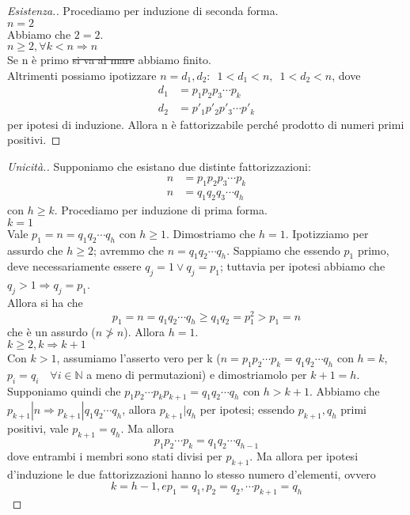 \documentclass[12pt,twoscolu]{article}
\newcommand{\N}{\mathbb{N}}
\newcommand{\implica}{\Longrightarrow}
\renewcommand\qedsymbol{$\blacksquare$}
\newcommand{\baseinduz}[1]{\\[1\baselineskip]{\boldmath$n = #1$}}
\newcommand{\induzdue}[1]{\\[1\baselineskip]{\boldmath$n \ge #1, \forall k < n \implica n$}}
\begin{document}
\renewcommand\qedsymbol{$\square$}
\begin{proof}[Esistenza.]
Procediamo per induzione di seconda forma.
\baseinduz{2}
\\Abbiamo che $ 2 = 2 $.
\induzdue{2}
\\Se n è primo \sout{si va al mare} abbiamo finito.
\\Altrimenti possiamo ipotizzare $n = d_1, d_2 :\enspace1 < d_1 < n,\enspace1 < d_2 < n$, dove
\begin{align*}
d_1 &= p_1 p_2 p_3 \cdots p_k \\
 d_2 &= p'_1 p'_2 p'_3 \cdots p'_k
\end{align*}
 per ipotesi di induzione. Allora n è fattorizzabile perché prodotto di numeri primi positivi.
\end{proof}

\renewcommand\qedsymbol{$\blacksquare$}
\begin{proof}[Unicità.]
Supponiamo che esistano due distinte fattorizzazioni:
\begin{align*}
n &= p_1 p_2 p_3 \cdots p_k \\
n &= q_1 q_2 q_3 \cdots q_h
\end{align*}
con $h \ge k$. Procediamo per induzione di prima forma.
\\[1\baselineskip]{\boldmath$k = 1$}
\\Vale $p_1 = n = q_1 q_2 \cdots q_h$ con $h \ge 1$. Dimostriamo che $h = 1$. Ipotizziamo per assurdo che $ h \ge 2$; avremmo che $ n = q_1 q_2 \cdots q_h$. Sappiamo che essendo $p_1$ primo, deve necessariamente essere $ q_j = 1 \lor q_j = p_1$; tuttavia per ipotesi abbiamo che $q_j > 1 \implica q_j = p_1$.
\\Allora si ha che
$$ p_1 = n = q_1 q_2 \cdots q_h \ge q_1 q_2 = p^2_1 > p_1 = n $$
che è un assurdo ($n \ngtr n$). Allora $h = 1$.
\\[1\baselineskip]{\boldmath$k \ge 2, k \implica k+1$}
\\Con $ k > 1 $, assumiamo l'asserto vero per k ($n = p_1 p_2 \cdots p_k = q_1 q_2 \cdots q_h$ con $h = k$, $p_i = q_i \quad\forall i \in \N$ a meno di permutazioni) e dimostriamolo per $k + 1 = h$. Supponiamo quindi che $p_1 p_2 \cdots p_k p_{k+1} = q_1 q_2 \cdots q_h$ con $h > k + 1$. Abbiamo che $p_{k+1} | n \implica p_{k+1} | q_1 q_2 \cdots q_h$, allora $p_{k+1} | q_h$ per ipotesi; essendo $p_{k+1}, q_h$ primi positivi, vale $p_{k+1} = q_h$. Ma allora 
$$p_1 p_2 \cdots p_k = q_1 q_2 \cdots q_{h-1} $$
dove entrambi i membri sono stati divisi per $p_{k+1}$. Ma allora per ipotesi d'induzione le due fattorizzazioni hanno lo stesso numero d'elementi, ovvero 
$$k = h - 1, e p_1 = q_1, p_2 = q_2, \cdots p_{k+1} = q_h$$
\end{proof}
\end{document}
